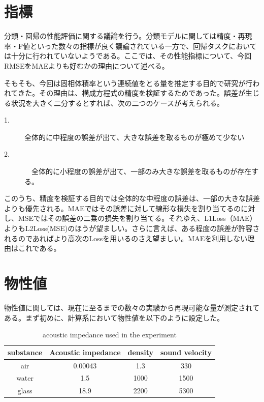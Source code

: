 \documentclass[uplatex]{suribt}
\begin{document}
\section{指標}
分類・回帰の性能評価に関する議論を行う。分類モデルに関しては精度・再現率・F値といった数々の指標が良く議論されている一方で、回帰タスクにおいては十分に行われていないようである。ここでは、その性能指標について、今回RMSEをMAEよりも好むかの理由について述べる。\par
そもそも、今回は固相体積率という連続値をとる量を推定する目的で研究が行われてきた。その理由は、構成方程式の精度を検証するためであった。誤差が生じる状況を大きく二分するとすれば、次の二つのケースが考えられる。
\begin{description}
    \item[1.] 全体的に中程度の誤差が出て、大きな誤差を取るものが極めて少ない
    \item[2.]　全体的に小程度の誤差が出て、一部のみ大きな誤差を取るものが存在する。
\end{description}
このうち、精度を検証する目的では全体的な中程度の誤差は、一部の大きな誤差よりも優先される。MAEではその誤差に対して線形な損失を割り当てるのに対し、MSEではその誤差の二乗の損失を割り当てる。それゆえ、L1Loss（MAE）よりもL2Loss(MSE)のほうが望ましい。さらに言えば、ある程度の誤差が許容されるのであればより高次のLossを用いるのさえ望ましい。MAEを利用しない理由はこれである。
\section{物性値}
物性値に関しては、現在に至るまでの数々の実験から再現可能な量が測定されてある。まず初めに、計算系において物性値を以下のように設定した。
\begin{table}[]
    \centering
    \begin{tabular}{c|c|c|c}
    \hline
         substance & Acoustic impedance & density & sound velocity \\
         \hline
         air&  0.00043 & 1.3 & 330\\
         water& 1.5 & 1000 & 1500\\
         glass & 18.9 & 2200 & 5300\\
         \hline
    \end{tabular}
    \caption{acoustic impedance used in the experiment}
    \label{tab:acoustic impedance}
\end{table}
\end{document}
